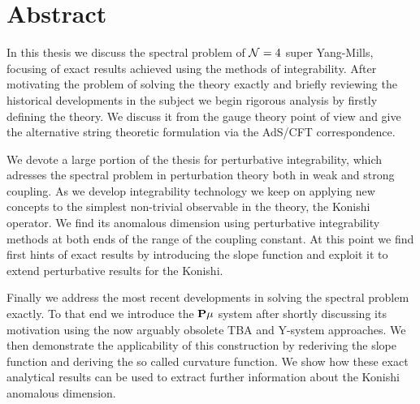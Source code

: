 
\section*{Abstract}

\vspace{30pt}

In this thesis we discuss the spectral problem of $\mathcal{N}=4$ super Yang-Mills, focusing of exact results achieved using the methods of integrability. 
After motivating the problem of solving the theory exactly and briefly reviewing the historical developments in the subject we begin rigorous analysis by firstly defining the theory. 
We discuss it from the gauge theory point of view and give the alternative string theoretic formulation via the AdS/CFT correspondence.

We devote a large portion of the thesis for perturbative integrability, which adresses the spectral problem in perturbation theory both in weak and strong coupling. 
As we develop integrability technology we keep on applying new concepts to the simplest non-trivial observable in the theory, the Konishi operator.
We find its anomalous dimension using perturbative integrability methods at both ends of the range of the coupling constant.
At this point we find first hints of exact results by introducing the slope function and exploit it to extend perturbative results for the Konishi.

Finally we address the most recent developments in solving the spectral problem exactly.
To that end we introduce the ${\bf P}\mu$ system after shortly discussing its motivation using the now arguably obsolete TBA and Y-system approaches. 
We then demonstrate the applicability of this construction by rederiving the slope function and deriving the so called curvature function.
We show how these exact analytical results can be used to extract further information about the Konishi anomalous dimension. 

